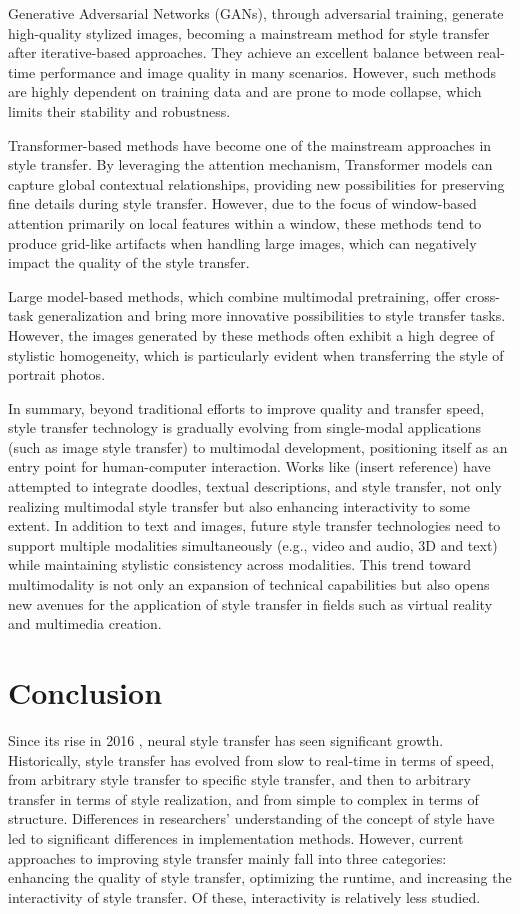 \documentclass[preprint,12pt]{elsarticle}
\begin{document}
Generative Adversarial Networks (GANs), through adversarial training, generate high-quality stylized images, becoming a mainstream method for style transfer after iterative-based approaches. They achieve an excellent balance between real-time performance and image quality in many scenarios. However, such methods are highly dependent on training data and are prone to mode collapse, which limits their stability and robustness.

Transformer-based methods have become one of the mainstream approaches in style transfer. By leveraging the attention mechanism, Transformer models can capture global contextual relationships, providing new possibilities for preserving fine details during style transfer. However, due to the focus of window-based attention primarily on local features within a window, these methods tend to produce grid-like artifacts when handling large images, which can negatively impact the quality of the style transfer.

Large model-based methods, which combine multimodal pretraining, offer cross-task generalization and bring more innovative possibilities to style transfer tasks. However, the images generated by these methods often exhibit a high degree of stylistic homogeneity, which is particularly evident when transferring the style of portrait photos.

In summary, beyond traditional efforts to improve quality and transfer speed, style transfer technology is gradually evolving from single-modal applications (such as image style transfer) to multimodal development, positioning itself as an entry point for human-computer interaction. Works like (insert reference) have attempted to integrate doodles, textual descriptions, and style transfer, not only realizing multimodal style transfer but also enhancing interactivity to some extent. In addition to text and images, future style transfer technologies need to support multiple modalities simultaneously (e.g., video and audio, 3D and text) while maintaining stylistic consistency across modalities. This trend toward multimodality is not only an expansion of technical capabilities but also opens new avenues for the application of style transfer in fields such as virtual reality and multimedia creation.
\section{Conclusion}

Since its rise in 2016\citep{02gatys2016image} , neural style transfer has seen significant growth. Historically, style transfer has evolved from slow to real-time in terms of speed, from arbitrary style transfer to specific style transfer, and then to arbitrary transfer in terms of style realization, and from simple to complex in terms of structure. Differences in researchers' understanding of the concept of style have led to significant differences in implementation methods. However, current approaches to improving style transfer mainly fall into three categories: enhancing the quality of style transfer, optimizing the runtime, and increasing the interactivity of style transfer. Of these, interactivity is relatively less studied.
\end{document}
